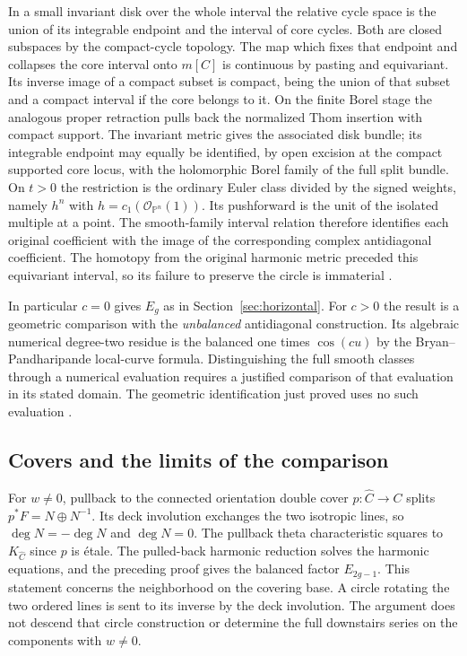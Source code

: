 In a small invariant disk over the whole interval the relative cycle space is the union of its integrable endpoint and the interval of core cycles. Both are closed subspaces by the compact-cycle topology. The map which fixes that endpoint and collapses the core interval onto \(m[C]\) is continuous by pasting and equivariant. Its inverse image of a compact subset is compact, being the union of that subset and a compact interval if the core belongs to it. On the finite Borel stage the analogous proper retraction pulls back the normalized Thom insertion with compact support. The invariant metric gives the associated disk bundle; its integrable endpoint may equally be identified, by open excision at the compact supported core locus, with the holomorphic Borel family of the full split bundle. On \(t>0\) the restriction is the ordinary Euler class divided by the signed weights, namely \(h^n\) with \(h=c_1(\mathcal O_{\mathbb P^n}(1))\). Its pushforward is the unit of the isolated multiple at a point. The smooth-family interval relation therefore identifies each original coefficient with the image of the corresponding complex antidiagonal coefficient. The homotopy from the original harmonic metric preceded this equivariant interval, so its failure to preserve the circle is immaterial \cite{WueProduct}.

In particular \(c=0\) gives \(E_g\) as in Section~\ref{sec:horizontal}. For \(c>0\) the result is a geometric comparison with the \emph{unbalanced} antidiagonal construction. Its algebraic numerical degree-two residue is the balanced one times \(\cos(cu)\) by the Bryan--Pandharipande local-curve formula. Distinguishing the full smooth classes through a numerical evaluation requires a justified comparison of that evaluation in its stated domain. The geometric identification just proved uses no such evaluation \cite{WueBalanced}.

\subsection{Covers and the limits of the comparison}

For \(w\ne0\), pullback to the connected orientation double cover \(p:\widehat C\to C\) splits \(p^*F=N\oplus N^{-1}\). Its deck involution exchanges the two isotropic lines, so \(\deg N=-\deg N\) and \(\deg N=0\). The pullback theta characteristic squares to \(K_{\widehat C}\) since \(p\) is étale. The pulled-back harmonic reduction solves the harmonic equations, and the preceding proof gives the balanced factor \(E_{2g-1}\). This statement concerns the neighborhood on the covering base. A circle rotating the two ordered lines is sent to its inverse by the deck involution. The argument does not descend that circle construction or determine the full downstairs series on the components with \(w\ne0\).

